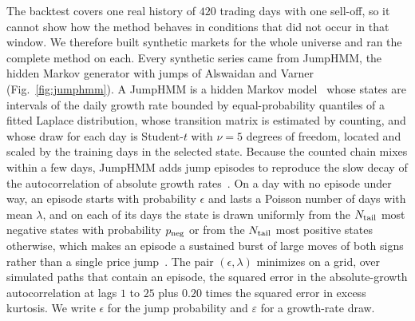 The backtest covers one real history of $420$ trading days with one sell-off, so it cannot show how the method
behaves in conditions that did not occur in that window. We therefore built synthetic markets for the whole universe
and ran the complete method on each. Every synthetic series came from JumpHMM, the hidden Markov generator with jumps
of Alswaidan and Varner~\cite{alswaidan2026variance} (Fig.~\ref{fig:jumphmm}). A JumpHMM is a hidden Markov
model~\cite{rabinerJuang1986,hamilton1989} whose states are intervals of the daily growth rate bounded by
equal-probability quantiles of a fitted Laplace distribution, whose transition matrix is estimated by counting, and
whose draw for each day is Student-$t$ with $\nu = 5$ degrees of freedom, located and scaled by the training days in
the selected state. Because the counted chain mixes within a few days, JumpHMM adds jump episodes to reproduce the
slow decay of the autocorrelation of absolute growth rates~\cite{mandelbrot1963,cont2001,bullaBulla2006}. On a day
with no episode under way, an episode starts with probability $\epsilon$ and lasts a Poisson number of days with mean
$\lambda$, and on each of its days the state is drawn uniformly from the $N_{\rm tail}$ most negative states with
probability $p_{\rm neg}$ or from the $N_{\rm tail}$ most positive states otherwise, which makes an episode a sustained
burst of large moves of both signs rather than a single price jump~\cite{merton1976,kou2002}. The pair
$(\epsilon, \lambda)$ minimizes on a grid, over simulated paths that contain an episode, the squared error in the
absolute-growth autocorrelation at lags $1$ to $25$ plus $0.20$ times the squared error in excess kurtosis. We write
$\epsilon$ for the jump probability and $\varepsilon$ for a growth-rate draw.

